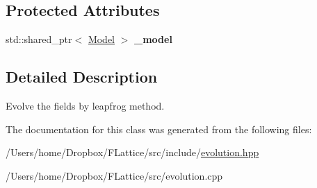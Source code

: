 \subsection*{Protected Attributes}
\begin{DoxyCompactItemize}
\item 
\mbox{\label{class_leap_frog_ae6204c50678b1ee804d35718b23e1e28}} 
std\+::shared\+\_\+ptr$<$ \mbox{\hyperlink{class_model}{Model}} $>$ {\bfseries \+\_\+model}
\end{DoxyCompactItemize}


\subsection{Detailed Description}
Evolve the fields by leapfrog method. 

The documentation for this class was generated from the following files\+:\begin{DoxyCompactItemize}
\item 
/\+Users/home/\+Dropbox/\+F\+Lattice/src/include/\mbox{\hyperlink{evolution_8hpp}{evolution.\+hpp}}\item 
/\+Users/home/\+Dropbox/\+F\+Lattice/src/evolution.\+cpp\end{DoxyCompactItemize}
